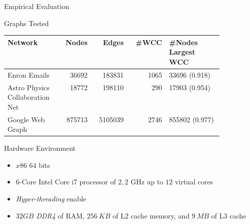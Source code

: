 \documentclass{beamer}
\begin{document}
  \begin{frame}[fragile]{Empirical Evaluation}
    \begin{block}{Graphs Tested}
    \begin{table}[H]
      \centering
      \begin{tabular}{|p{0.25\linewidth}|r|r|r|p{0.25\linewidth}|}
       \hline
       \textbf{Network} & \textbf{Nodes} & \textbf{Edges} & \textbf{\#WCC} & \textbf{\#Nodes Largest WCC} \\
       \hline
       Enron Emails & 36692 & 183831 & 1065 & 33696 (0.918) \\
       \hline
       Astro Physics Collaboration Net & 18772 & 198110 & 290 & 17903 (0.954)\\
       \hline
       Google Web Graph & 875713 & 5105039 & 2746 & 855802 (0.977)\\
       \hline
      \end{tabular}
     \end{table}
    \end{block}
    \begin{block}{Hardware Environment}
      \begin{itemize}
            \item $x86$ $64$ bits
            \item $6$-Core Intel Core i7 processor of $2,2$ GHz up to $12$ virtual cores
            \item \emph{Hyper-threading} enable
            \item $32 GB$ \emph{DDR4} of RAM, $256\ KB$ of L2 cache memory, and $9\ MB$ of L3 cache
        \end{itemize}        
    \end{block}
  \end{frame}
\end{document}

